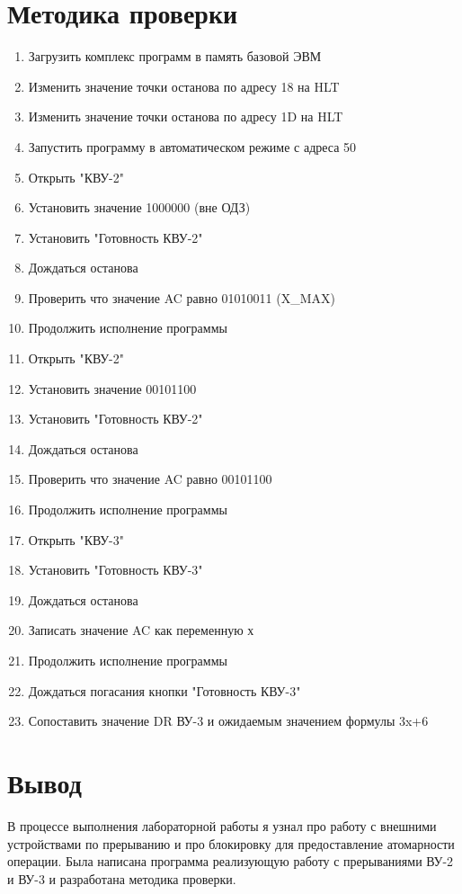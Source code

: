 \documentclass[12pt]{article}
\begin{document}
	\section{Методика проверки}
	\begin{enumerate}[]
		\item Загрузить комплекс программ в память базовой ЭВМ
		\item Изменить значение точки останова по адресу 18 на HLT
		\item Изменить значение точки останова по адресу 1D на HLT
		\item Запустить программу в автоматическом режиме с адреса 50
		\item Открыть "КВУ-2"
		\item Установить значение 1000000 (вне ОДЗ)
		\item Установить "Готовность КВУ-2"
		\item Дождаться останова
		\item Проверить что значение AC равно 01010011 (X_MAX)
		\item Продолжить исполнение программы
		\item Открыть "КВУ-2"
		\item Установить значение 00101100
		\item Установить "Готовность КВУ-2"
		\item Дождаться останова
		\item Проверить что значение AC равно 00101100
		\item Продолжить исполнение программы
		\item Открыть "КВУ-3"
		\item Установить "Готовность КВУ-3"
		\item Дождаться останова
		\item Записать значение AC как переменную х
		\item Продолжить исполнение программы
		\item Дождаться погасания кнопки "Готовность КВУ-3"
		\item Сопоставить значение DR ВУ-3 и ожидаемым значением формулы 3x+6
	 \end{enumerate}
 	\newpage
 
 	\section{Вывод}
 	В процессе выполнения лабораторной работы я узнал про работу с внешними устройствами по прерыванию и про блокировку для предоставление атомарности операции. Была написана программа реализующую работу с прерываниями ВУ-2 и ВУ-3 и разработана методика проверки. 
\end{document}
